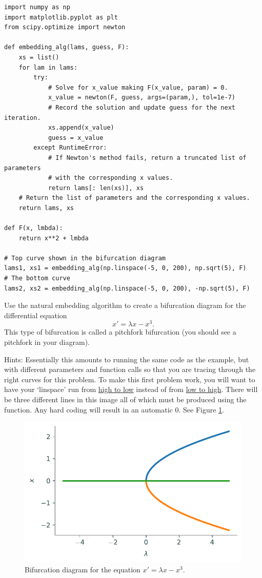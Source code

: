 \newpage
\begin{lstlisting}
import numpy as np
import matplotlib.pyplot as plt
from scipy.optimize import newton

def embedding_alg(lams, guess, F):
    xs = list()
    for lam in lams:
        try:
            # Solve for x_value making F(x_value, param) = 0.
            x_value = newton(F, guess, args=(param,), tol=1e-7)
            # Record the solution and update guess for the next iteration.
            xs.append(x_value)
            guess = x_value
        except RuntimeError:
            # If Newton's method fails, return a truncated list of parameters
            # with the corresponding x values.
            return lams[: len(xs)], xs
    # Return the list of parameters and the corresponding x values.
    return lams, xs

def F(x, lmbda):
    return x**2 + lmbda

# Top curve shown in the bifurcation diagram
lams1, xs1 = embedding_alg(np.linspace(-5, 0, 200), np.sqrt(5), F)
# The bottom curve
lams2, xs2 = embedding_alg(np.linspace(-5, 0, 200), -np.sqrt(5), F)
\end{lstlisting}

\begin{problem}
Use the natural embedding algorithm to create a bifurcation diagram for the differential equation
\[x' = \lambda x-x^3.\]
This type of bifurcation is called a pitchfork bifurcation (you should see a pitchfork in your diagram).

Hints: Essentially this amounts to running the same code as the example, but with different parameters and function calls so that you are tracing through the right curves for this problem.
To make this first problem work, you will want to have your `linspace' run from \underline{high to low} instead of from \underline{low to high}.
There will be three different lines in this image all of which must be produced using the  function. Any hard coding will result in an automatic 0.
See Figure \ref{prob1}.
\end{problem}

\begin{figure}[H]
\centering
\includegraphics[width=\textwidth]{figures/prob1.pdf}
\caption{Bifurcation diagram for the equation $x' = \lambda x - x^3$.}
\label{prob1}
\end{figure}

